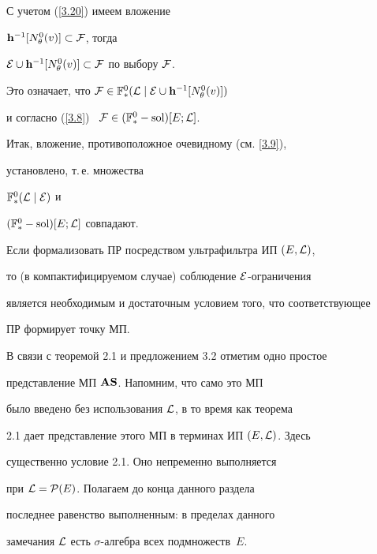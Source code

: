{\begin{pf}
С учетом (\ref{3.20}) имеем вложение


${{\bold h}^{-1}}[{N_\theta^0}(v)] \subset {\cal F}$, тогда


${\cal E}\cup{{\bold h}^{-1}}[{N_\theta^0}(v)]


\subset {\cal F}$ по выбору ${\cal F}$.


Это означает, что ${\cal F} \in {{\Bbb F}_*^0}({\cal L}\mid{\cal


E}\cup{{\bold h}^{-1}}[{N_\theta^0}(v)])$ 


и согласно (\ref{3.8}) \ ${\cal F} \in ({{\Bbb F}_*^0}-\operatorname{sol})[E;{\cal L}]$.


Итак, вложение, противоположное очевидному (см. \eqref{3.9}),


установлено, т.\,е. множества


${{\Bbb F}_*^0}({\cal L}\mid{\cal E})$ и


$({{\Bbb F}_*^0}-\operatorname{sol})[E;{\cal L}]$ совпадают.


\end{pf}





Если формализовать ПР посредством ультрафильтра ИП $(E,{\cal L})$,


то (в компактифицируемом случае) соблюдение ${\cal E}$-ограничения


является необходимым и достаточным условием того, что соответствующее


ПР формирует точку МП.








\begin{notes}


В связи с теоремой 2.1 и предложением 3.2 отметим одно простое


представление МП ${\bold A}{\bold S}$. Напомним, что само это МП


было введено без использования ${\cal L}$, в то время как теорема


2.1 дает представление этого МП в терминах ИП $(E,{\cal L})$. Здесь


существенно условие 2.1. Оно непременно выполняется


при ${\cal L} = {{\cal P}(E)}$. Полагаем до конца данного раздела


последнее равенство выполненным: в пределах данного


замечания ${\cal L}$ есть $\sigma$-алгебра всех подмножеств~$E$.



\end{notes}}
